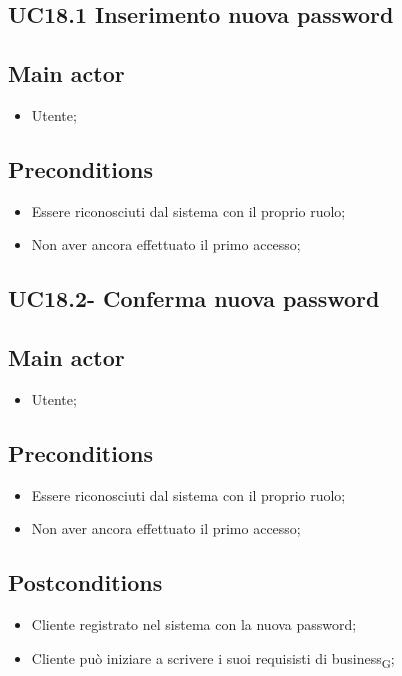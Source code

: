 \documentclass{article}
\begin{document}
        \subsection{UC18.1 Inserimento nuova password}
            \subsection*{Main actor}
        \begin{itemize}
            \item Utente;
        \end{itemize}
        
    \subsection*{Preconditions}
        \begin{itemize}
            \item Essere riconosciuti dal sistema con il proprio ruolo;
            \item Non aver ancora effettuato il primo accesso;
        \end{itemize}

    \subsection{UC18.2- Conferma nuova password}
    \subsection*{Main actor}
        \begin{itemize}
            \item Utente;
        \end{itemize}
        
    \subsection*{Preconditions}
        \begin{itemize}
            \item Essere riconosciuti dal sistema con il proprio ruolo;
            \item Non aver ancora effettuato il primo accesso;
        \end{itemize}
        
    \subsection*{Postconditions}
        \begin{itemize}
            \item Cliente registrato nel sistema con la nuova password;
            \item Cliente può iniziare a scrivere i suoi requisisti di business\textsubscript{G};
        \end{itemize}
\end{document}
